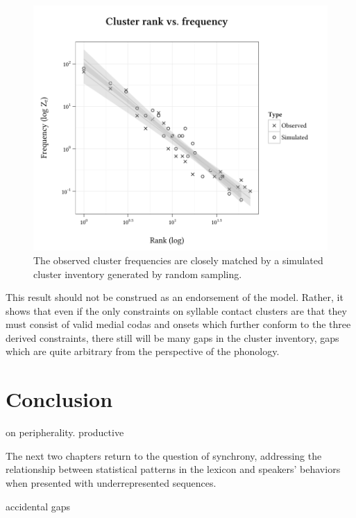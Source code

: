 \begin{figure}
\centering
\includegraphics{sim.pdf}
\caption{The observed cluster frequencies are closely matched by a simulated cluster inventory generated by random sampling.}
\label{sim}
\end{figure}

This result should not be construed as an endorsement of the \citet{Pierrehumbert1994} model. Rather, it shows that even if the only constraints on syllable contact clusters are that they must consist of valid medial codas and onsets which further conform to the three derived constraints, there still will be many gaps in the cluster inventory, gaps which are quite arbitrary from the perspective of the phonology.

\section{Conclusion}

\citet{Borowsky1989} on peripherality.
productive \citet{Duanmu2008}

The next two chapters return to the question of synchrony, addressing the relationship between statistical patterns in the lexicon and speakers' behaviors when presented with underrepresented sequences.

accidental gaps
\citet[][419f.]{Hayes2008a}


